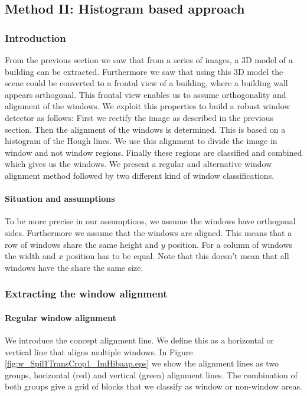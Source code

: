 


\subsection{Method II: Histogram based approach} 
\label{sec:method2}
\subsubsection{Introduction}
From the previous section we saw that from a series of images, a 3D model of a
building can be extracted. Furthermore we saw that using this 3D model the
scene could be converted to a frontal view of a building, where a building wall
appears orthogonal.  This frontal view enables us to assume orthogonality and
alignment of the windows.  We exploit this properties to build a robust window
detector as follows:
First we rectify the image as described in the previous section.  Then the alignment of the windows
is determined. This is based on a histogram of the Hough lines. We use this
alignment to divide the image in window and not window regions.  Finally these
regions are classified and combined which gives us the windows.
We present a regular and alternative window alignment method
followed by two different kind of window classifications. 


\paragraph{Situation and assumptions}
To be more precise in our assumptions, we assume the windows have orthogonal
sides.  Furthermore we assume that the windows are aligned. This means that a
row of windows share the same height and $y$ position. For a column of windows
the width and $x$ position has to be equal.  Note that this doesn't mean that
all windows have the share the same size.



\subsubsection{Extracting the window alignment}
\paragraph{Regular window alignment}
We introduce the concept alignment line. We define this as a horizontal or
vertical line that aligns multiple windows. In Figure
\ref{fig:w_Spil1TransCrop1_ImHibaap.eps}
we show the alignment lines as two groups, horizontal (red) and
vertical (green) alignment lines.  The combination of both groups give a grid of
blocks that we classify as window or non-window areas.\\

